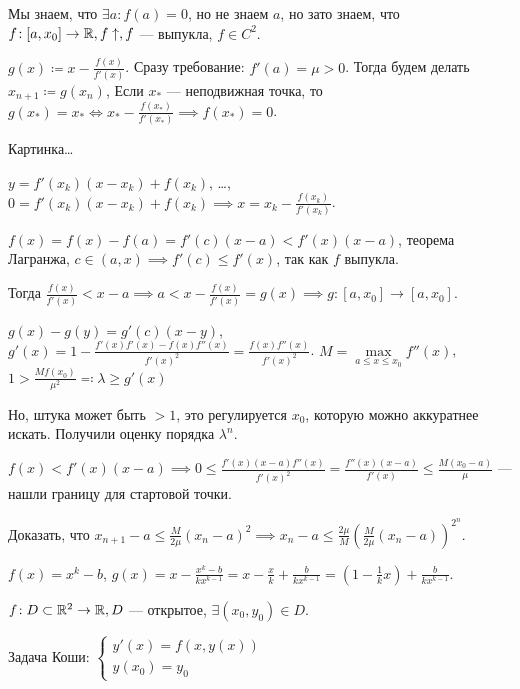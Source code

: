 \begin{example}
    Мы знаем, что $\exists a\!: f(a) = 0$, но не знаем  $a$, но зато знаем, что  $f\!: [a, x_0] \to \mathbb{R}, f\uparrow, f$ --- выпукла, $f \in C^2$.

    $g(x) \coloneqq x - \frac{f(x)}{f'(x)}$. Сразу требование: $f'(a) = \mu > 0$. Тогда будем делать  $x_{n+1} \coloneqq g(x_n)$, Если $x_*$ --- неподвижная точка, то  $g(x_*) = x_* \iff x_* - \frac{f(x_*)}{f'(x_*)} \implies f(x_*) = 0$.

    Картинка\dots

    $y = f'(x_k)(x-x_k) + f(x_k)$, \dots, $0 = f'(x_k)(x-x_k) + f(x_k) \implies x = x_k - \frac{f(x_k)}{f'(x_k)}$.

    $f(x) = f(x) - f(a) = f'(c)(x-a) < f'(x)(x-a)$, теорема Лагранжа,  $c \in (a, x) \implies f'(c) \le f'(x)$, так как $f$ выпукла.

    Тогда  $\frac{f(x)}{f'(x)} < x-a \implies a < x - \frac{f(x)}{f'(x)} = g(x) \implies g\!: [a, x_0] \to [a, x_0]$.

    $g(x) - g(y) = g'(c)(x-y)$,  $g'(x) = 1 - \frac{f'(x) f'(x) - f(x)f''(x)}{f'(x)^2} = \frac{f(x)f''(x)}{f'(x)^2}$. $M = \max\limits_{a \le x \le x_0} f''(x)$, $1 > \frac{Mf(x_0)}{\mu^2} \eqqcolon \lambda \ge g'(x)$

    Но, штука может быть $>1$, это регулируется  $x_0$, которую можно аккуратнее искать. Получили оценку порядка  $\lambda^n$.

     $f(x) < f'(x)(x-a) \implies 0 \le \frac{f'(x)(x-a)f''(x)}{f'(x)^2} = \frac{f''(x)(x-a)}{f'(x)} \le \frac{M(x_0 - a)}{\mu}$ --- нашли границу для стартовой точки.

     \begin{exerc}
         Доказать, что $x_{n+1} - a \le \frac{M}{2\mu}(x_n-a)^2 \implies x_n -a \le \frac{2\mu}{M}(\frac{M}{2\mu}(x_n-a))^{2^n}$.
     \end{exerc}
\end{example}
\begin{remark}
    $f(x) = x^k - b$,  $g(x) = x - \frac{x^k - b}{kx^{k-1}} = x - \frac{x}{k} + \frac{b}{kx^{k-1}} = (1-\frac{1}{k}x)+\frac{b}{kx^{k-1}}$.
\end{remark}
\begin{definition}
    $f\!: D \subset \mathbb{R}^2 \to \mathbb{R}, D$ --- открытое, $\exists (x_0, y_0) \in D$.

     Задача Коши: $
\begin{cases}
    y'(x) = f(x, y(x))\\
    y(x_0) = y_0
\end{cases}
     $
\end{definition}
